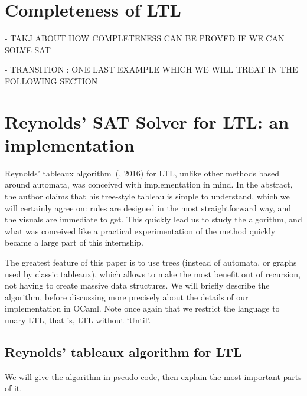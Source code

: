 \documentclass[11pt]{article}
\theoremstyle{definition}
\begin{document}
\section{Completeness of LTL}\label{SecLTLcomp}
 
- TAKJ ABOUT HOW COMPLETENESS CAN BE PROVED IF WE CAN SOLVE SAT



- TRANSITION : ONE LAST EXAMPLE WHICH WE WILL TREAT IN THE FOLLOWING SECTION

\section{Reynolds' SAT Solver for LTL: an implementation}\label{SecOcaml}

Reynolds' tableaux algorithm~(\cite{ReyLTL}, 2016) for LTL, unlike other methods based around automata, was conceived
with implementation in mind. In the abstract, the author claims that his tree-style tableau is simple to understand, which we will
certainly agree on: rules are designed in the most straightforward way, and the visuals are immediate to get. This quickly lead us 
to study the algorithm, and what was conceived like a practical experimentation of the method quickly became a large part of this internship.

The greatest feature of this paper is to use trees (instead of automata, or graphs used by classic tableaux), which allows to
make the most benefit out of recursion, not having to create massive data structures. We will briefly describe the algorithm, before discussing
more precisely about the details of our implementation in OCaml. Note once again that we restrict the language to unary LTL,
that is, LTL without `Until'.


\subsection{Reynolds' tableaux algorithm for LTL}

We will give the algorithm in pseudo-code, then explain the most important parts of it.\\
\end{document}
